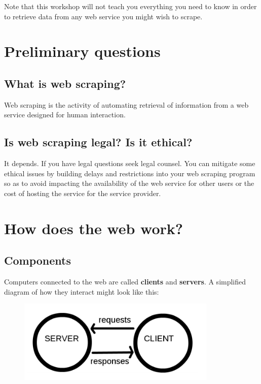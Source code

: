 \documentclass[]{book}
\begin{document}
Note that this workshop will not teach you everything you need to know
in order to retrieve data from any web service you might wish to scrape.

\section{Preliminary questions}\label{preliminary-questions}

\subsection{What is web scraping?}\label{what-is-web-scraping}

Web scraping is the activity of automating retrieval of information from
a web service designed for human interaction.

\subsection{Is web scraping legal? Is it
ethical?}\label{is-web-scraping-legal-is-it-ethical}

It depends. If you have legal questions seek legal counsel. You can
mitigate some ethical issues by building delays and restrictions into
your web scraping program so as to avoid impacting the availability of
the web service for other users or the cost of hosting the service for
the service provider.

\section{How does the web work?}\label{how-does-the-web-work}

\subsection{Components}\label{components}

Computers connected to the web are called \textbf{clients} and
\textbf{servers}. A simplified diagram of how they interact might look
like this:

\begin{figure}
\centering
\includegraphics{Python/PythonWebScrape/images/client_server.png}
\caption{}
\end{figure}
\end{document}
